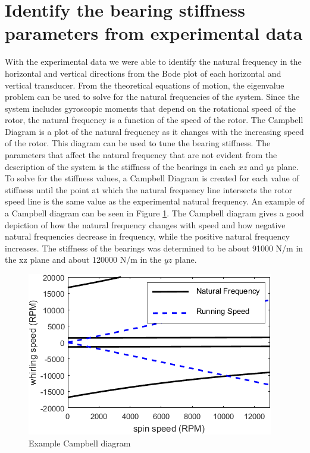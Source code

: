 	\section{Identify the bearing stiffness parameters from experimental data}
		With the experimental data we were able to identify the natural frequency in the horizontal and vertical directions from the Bode plot of each horizontal and vertical transducer. From the theoretical equations of motion, the eigenvalue problem can be used to solve for the natural frequencies of the system. Since the system includes gyroscopic moments that depend on the rotational speed of the rotor, the natural frequency is a function of the speed of the rotor. The Campbell Diagram is a plot of the natural frequency as it changes with the increasing speed of the rotor. This diagram can be used to tune the bearing stiffness. The parameters that affect the natural frequency that are not evident from the description of the system is the stiffness of the bearings in each $xz$ and $yz$ plane. To solve for the stiffness values, a Campbell Diagram is created for each value of stiffness until the point at which the natural frequency line intersects the rotor speed line is the same value as the experimental natural frequency. An example of a Campbell diagram can be seen in Figure \ref{fig:Figure_4}. The Campbell diagram gives a good depiction of how the natural frequency changes with speed and how negative natural frequencies decrease in frequency, while the positive natural frequency increases. The stiffness of the bearings was determined to be about 91000 N/m in the xz plane and about 120000 N/m in the $yz$ plane.\par 
		\begin{figure}[H]
			\centering
			\includegraphics[scale=.75]{./figures/Images/Figure_4.png}
			\caption{Example Campbell diagram}
			\label{fig:Figure_4}
		\end{figure}

